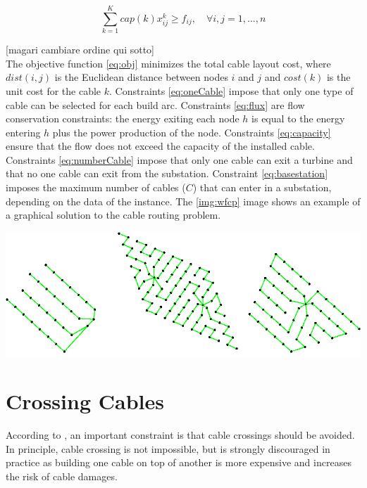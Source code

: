 \begin{equation}\label{eq:capacity}
	\sum^K_{k=1} cap(k)x^k_{ij} \geq f_{ij}, \quad \forall i,j = 1,...,n
\end{equation}

[magari cambiare ordine qui sotto]\\
The objective function \ref{eq:obj} minimizes the total cable layout cost, where $dist(i, j)$ is the Euclidean distance between nodes $i$ and $j$ and $cost(k)$ is the unit cost for the cable $k$. 
Constraints \ref{eq:oneCable} impose that only one type of cable can be selected for each build arc.
Constraints \ref{eq:flux} are flow conservation constraints: the energy exiting each node $h$ is equal to the energy entering $h$ plus the power production of the node. 
Constraints \ref{eq:capacity} ensure that the flow does not exceed the capacity of the installed cable.
Constraints \ref{eq:numberCable} impose that only one cable can exit a turbine and that no one cable can exit from the substation. 
Constraint \ref{eq:basestation} imposes the maximum number of cables ($C$) that can enter in a substation, depending on the data of the instance. The \ref{img:wfcp} image shows an example of a graphical solution to the cable routing problem.

\begin{center}
	\includegraphics[scale=0.4]{Graphics/wfcp.png}
	\label{img:wfcp}
\end{center}
	
\section{Crossing Cables}
According to \cite{wfcp}, an important constraint is that cable crossings should be avoided. In principle, cable crossing is not impossible, but is strongly discouraged in practice as building one cable on top of another is more expensive and increases the risk of cable damages.\\


